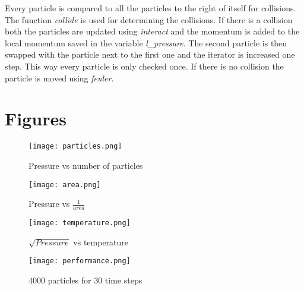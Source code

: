 \documentclass[a4paper, 12pt]{article}
\begin{document}
Every particle is compared to all the particles to the right of itself for
collisions. The function \textit{collide} is used for determining the
collisions. If there is a collision both the particles are updated using
\textit{interact} and the momentum is added to the local momentum saved in the
variable \textit{l\_pressure}. The second particle is then swapped with the
particle next to the first one and the iterator is increased one step. This way
every particle is only checked once. If there is no collision the particle is
moved using \textit{feuler}.

\newpage
\appendix
\section{Figures}
\label{sec:fig}
\begin{figure}[hb]
        \centering
        \texttt{[image: particles.png]}
        \caption{Pressure vs number of particles}
        \label{fig:n}
\end{figure}
\begin{figure}[hb]
        \centering
        \texttt{[image: area.png]}
        \caption{Pressure vs $\frac{1}{area}$}
        \label{fig:V}
\end{figure}
\begin{figure}[hb]
        \centering
        \texttt{[image: temperature.png]}
        \caption{$\sqrt{Pressure}$ vs temperature}
        \label{fig:T}
\end{figure}
\begin{figure}[h]
        \centering
        \texttt{[image: performance.png]}
        \caption{4000 particles for 30 time steps}
        \label{fig:perf}
\end{figure}
\end{document}
